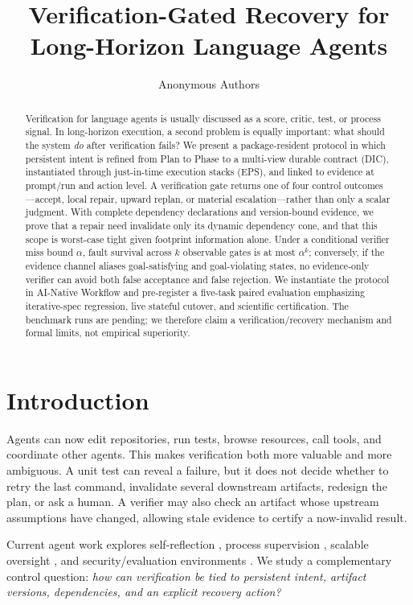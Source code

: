 \documentclass{article}
\title{Verification-Gated Recovery for Long-Horizon Language Agents}
\author{Anonymous Authors}
\begin{document}
\maketitle

\begin{abstract}
Verification for language agents is usually discussed as a score, critic, test, or process signal. In long-horizon execution, a second problem is equally important: what should the system \emph{do} after verification fails? We present a package-resident protocol in which persistent intent is refined from Plan to Phase to a multi-view durable contract (DIC), instantiated through just-in-time execution stacks (EPS), and linked to evidence at prompt/run and action level. A verification gate returns one of four control outcomes---accept, local repair, upward replan, or material escalation---rather than only a scalar judgment. With complete dependency declarations and version-bound evidence, we prove that a repair need invalidate only its dynamic dependency cone, and that this scope is worst-case tight given footprint information alone. Under a conditional verifier miss bound $\alpha$, fault survival across $k$ observable gates is at most $\alpha^k$; conversely, if the evidence channel aliases goal-satisfying and goal-violating states, no evidence-only verifier can avoid both false acceptance and false rejection. We instantiate the protocol in AI-Native Workflow and pre-register a five-task paired evaluation emphasizing iterative-spec regression, live stateful cutover, and scientific certification. The benchmark runs are pending; we therefore claim a verification/recovery mechanism and formal limits, not empirical superiority.
\end{abstract}

\section{Introduction}
Agents can now edit repositories, run tests, browse resources, call tools, and coordinate other agents. This makes verification both more valuable and more ambiguous. A unit test can reveal a failure, but it does not decide whether to retry the last command, invalidate several downstream artifacts, redesign the plan, or ask a human. A verifier may also check an artifact whose upstream assumptions have changed, allowing stale evidence to certify a now-invalid result.

Current agent work explores self-reflection \citep{shinn2023reflexion}, process supervision \citep{lightman2023verify}, scalable oversight \citep{irving2018debate,leike2018recursive,burns2024weakstrong}, and security/evaluation environments \citep{ruan2024toolemu,debenedetti2024agentdojo}. We study a complementary control question: \emph{how can verification be tied to persistent intent, artifact versions, dependencies, and an explicit recovery action?}
\end{document}
